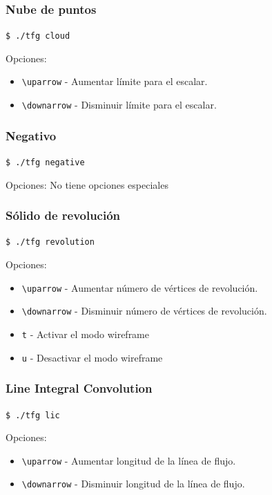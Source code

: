 \subsubsection{Nube de puntos}

\verb|$ ./tfg cloud|

Opciones:

\begin{itemize}
		\item \verb|\uparrow| - Aumentar límite para el escalar.
		\item \verb|\downarrow| - Disminuir límite para el escalar.
\end{itemize}

\subsubsection{Negativo}

\verb|$ ./tfg negative|

Opciones: No tiene opciones especiales

\subsubsection{Sólido de revolución}

\verb|$ ./tfg revolution|

Opciones:

\begin{itemize}
		\item \verb|\uparrow| - Aumentar número de vértices de revolución.
		\item \verb|\downarrow| - Disminuir número de vértices de revolución.
		\item \verb|t| - Activar el modo wireframe
		\item \verb|u| - Desactivar el modo wireframe
\end{itemize}

\subsubsection{Line Integral Convolution}

\verb|$ ./tfg lic|

Opciones:

\begin{itemize}
		\item \verb|\uparrow| - Aumentar longitud de la línea de flujo.
		\item \verb|\downarrow| - Disminuir longitud de la línea de flujo.
\end{itemize}
